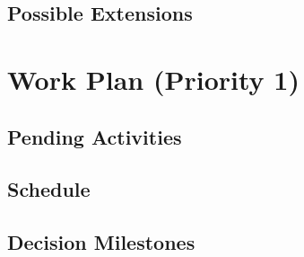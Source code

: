 \documentclass[12pt,a4paper]{report}
\begin{document}
\section{Possible Extensions}

%



\chapter{Work Plan (Priority 1)}

\section{Pending Activities}

%

\section{Schedule}


\section{Decision Milestones}

\end{document}
